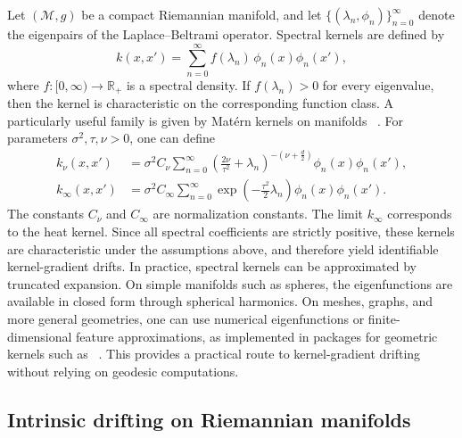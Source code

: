 \documentclass{article}
\theoremstyle{plain}
\newcommand{\M}{\mathcal{M}}
\begin{document}
Let \((\M,g)\) be a compact Riemannian manifold, and let
\(\{(\lambda_n,\phi_n)\}_{n=0}^{\infty}\) denote the eigenpairs of the
Laplace--Beltrami operator. Spectral kernels are defined by
\begin{equation}
\label{eq:spectral_kernel}
k(x,x')
=
\sum_{n=0}^{\infty}
f(\lambda_n)\,\phi_n(x)\phi_n(x'),
\end{equation}
where \(f : [0,\infty)\to \mathbb{R}_{+}\) is a spectral density. If
\(f(\lambda_n)>0\) for every eigenvalue, then  the kernel is characteristic on the corresponding function class. A particularly useful family is given by Matérn kernels on manifolds
~\citep{borovitskiy2020matern}. For parameters \(\sigma^2,\tau,\nu>0\), one
can define
\begin{align}
\label{eq:matern_kernel}
k_{\nu}(x,x')
&=
\sigma^2 C_{\nu}
\sum_{n=0}^{\infty}
\left(
\frac{2\nu}{\tau^2}+\lambda_n
\right)^{-\left(\nu+\frac{d}{2}\right)}
\phi_n(x)\phi_n(x'),
\\
\label{eq:heat_kernel}
k_{\infty}(x,x')
&=
\sigma^2 C_{\infty}
\sum_{n=0}^{\infty}
\exp\!\left(
-\frac{\tau^2}{2}\lambda_n
\right)
\phi_n(x)\phi_n(x').
\end{align}
The constants \(C_\nu\) and \(C_\infty\) are normalization constants. The limit \(k_\infty\) corresponds to the heat kernel. Since all
spectral coefficients are strictly positive, these kernels are characteristic
under the assumptions above, and therefore yield identifiable kernel-gradient
drifts. In practice, spectral kernels can be approximated by truncated expansion. On simple manifolds such as spheres, the eigenfunctions are available in closed
form through spherical harmonics. On meshes, graphs, and more general geometries, one can use numerical
eigenfunctions or finite-dimensional feature approximations, as implemented in
packages for geometric kernels such as ~\citep{JMLR:v26:24-1185}. This provides a practical
route to kernel-gradient drifting without relying on geodesic computations. 

\subsection{Intrinsic drifting on Riemannian manifolds}
\label{sec:riemannian_drifting}
\end{document}
